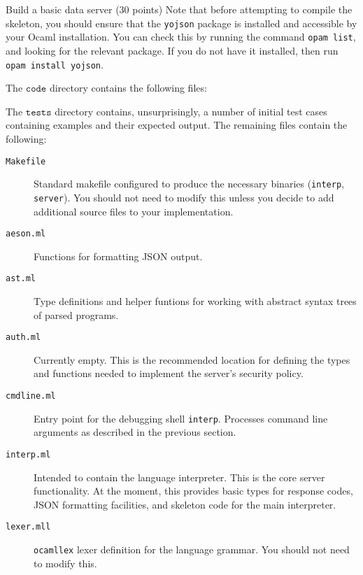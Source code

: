 \documentclass[11pt]{article}
\begin{document}
\begin{problem}{Build a basic data server (30 points)}
Note that before attempting to compile the skeleton, you should ensure that the \texttt{yojson} package is installed and accessible by your Ocaml installation. You can check this by running the command \texttt{opam list}, and looking for the relevant package. If you do not have it installed, then run \texttt{opam install yojson}.

The $\mathtt{code}$ directory contains the following files:


\noindent
The $\mathtt{tests}$ directory contains, unsurprisingly, a number of initial test cases containing examples and their expected output. The remaining files contain the following:
\begin{description}
\item[\texttt{Makefile}] Standard makefile configured to produce the necessary binaries (\texttt{interp}, \texttt{server}). You should not need to modify this unless you decide to add additional source files to your implementation.

\item[\texttt{aeson.ml}] Functions for formatting JSON output.

\item[\texttt{ast.ml}] Type definitions and helper funtions for working with abstract syntax trees of parsed programs.

\item[\texttt{auth.ml}] Currently empty. This is the recommended location for defining the types and functions needed to implement the server's security policy.

\item[\texttt{cmdline.ml}] Entry point for the debugging shell \texttt{interp}. Processes command line arguments as described in the previous section.

\item[\texttt{interp.ml}] Intended to contain the language interpreter. This is the core server functionality. At the moment, this provides basic types for response codes, JSON formatting facilities, and skeleton code for the main interpreter. 

\item[\texttt{lexer.mll}] \texttt{ocamllex} lexer definition for the language grammar. You should not need to modify this.


\end{description}
\end{problem}
\end{document}
